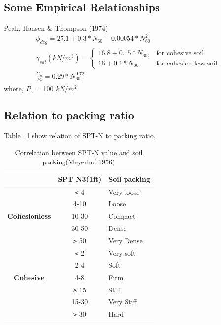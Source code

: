 \subsection{Some Empirical Relationships} \label{emp-form}
Peak, Hansen \& Thompson (1974)\cite{kulhawy_manual_1990}
\begin{gather}
{\phi}_{deg}=27.1+0.3*N_{60}-0.00054*N_{60}^2 \label{phi-form}\\
{\gamma}_{sat}(kN/m^3)= \begin{cases}
    16.8+0.15*N_{60}, & \text{for cohesive soil}\\
    16+0.1*N_{60}, & \text{for cohesion less soil}
    \end{cases}\\
\frac{C_u}{P_a} = 0.29*N_{60}^{0.72} \label{cu-form}
\end{gather}
where, $P_a$ = 100 $kN/m^2$

\subsection{Relation to packing ratio}
Table ~\ref{cbsf-table} show relation of SPT-N to packing ratio.

\begin{table}
  \centering
  \caption{Correlation between SPT-N value and soil packing(Meyerhof 1956)}
  \label{cbsf-table}
  \begin{tabular}{|c|c|l|}
  \hline &\bfseries{SPT N3(1ft)} & \bfseries{Soil packing} \\
  \hline \multirow{5}{*}{\begin{sideways}\bfseries{Cohesionless}\end{sideways}} & \verb"<" 4 & Very loose \\
  \cline{2-3} & 4-10 & Loose \\
  \cline{2-3} & 10-30 & Compact \\
  \cline{2-3} & 30-50 & Dense \\
  \cline{2-3} & \verb">" 50 & Very Dense \\
  \hline \multirow{5}{*}{\begin{sideways}\bfseries{Cohesive}\end{sideways}} & \verb"<" 2 & Very soft \\
  \cline{2-3} & 2-4 & Soft \\
  \cline{2-3} & 4-8 & Firm \\
  \cline{2-3} & 8-15 & Stiff \\
  \cline{2-3} & 15-30 & Very Stiff \\
  \cline{2-3} & \verb">" 30 & Hard \\
  \hline 
  \end{tabular}
\end{table}

